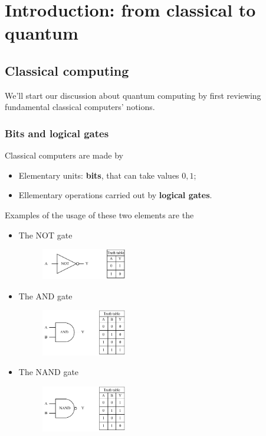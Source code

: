 \graphicspath{{chapters/01/}}
\chapter{Introduction: from classical to quantum}
\section{Classical computing}
We'll start our discussion about quantum computing by first reviewing fundamental classical computers' notions.
\subsection{Bits and logical gates}
Classical computers are made by 
\begin{itemize}
	\item Elementary units: \textbf{bits}, that can take values $0,1$;
	\item Ellementary operations carried out by \textbf{logical gates}.
\end{itemize}
Examples of the usage of these two elements are the
\begin{itemize}
 \item The NOT gate 
	 \begin{figure}[H]
 		\centering
		\includegraphics[width=0.35\textwidth]{not.pdf}
	\end{figure}
 \item The AND gate
 	\begin{figure}[H]
 		\centering
		\includegraphics[width=0.35\textwidth]{and.pdf}
	\end{figure}
 \item The NAND gate
 	\begin{figure}[H]
 		\centering
		\includegraphics[width=0.35\textwidth]{nand.pdf}
	\end{figure}
\end{itemize}

